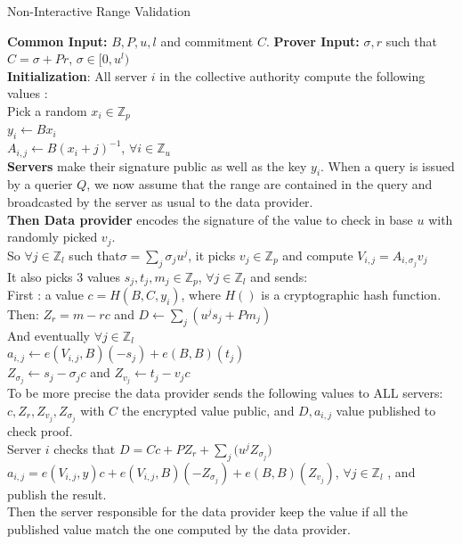 \documentclass{article}
\begin{document}
\begin{algorithm}
\caption{Non-Interactive Range Validation}\label{euclid}
\begin{algorithmic}[1]
\State \textbf{Common Input:} $B, P, u, l$ and commitment $C$.
\State \textbf{Prover Input:} $\sigma, r$ such that $C = \sigma + Pr$, $\sigma \in [0,u^l)$\\

\State \textbf{Initialization}: All server $i$ in the collective authority compute the following values :\\
Pick a random $x_i \in \mathbb{Z}_p$\\
$y_i \gets Bx_i$\\
$A_{i,j} \gets B(x_i + j)^{-1} $, $\forall i \in \mathbb{Z}_u$\\
\State  \textbf{Servers} make their signature public as well as the key $y_i$. When a query is issued by a querier $Q$, we now assume that the range are contained in the query and broadcasted by the server as usual to the data provider.\\

\State \textbf{Then Data provider} encodes the signature of the value to check in base $u$ with randomly picked $v_j$.\\
So $\forall j \in \mathbb{Z}_l $ such that$ \sigma = \sum_{j}{\sigma_j u^j}$, it picks $v_j \in \mathbb{Z}_p$ and compute $V_{i,j} = A_{i,\sigma_j}v_j$\\
It also picks 3 values $s_j,t_j,m_j \in \mathbb{Z}_p $, $\forall j \in \mathbb{Z}_l$ and sends:\\
First : a value $c = H(B,C,y_i)$, where $H()$ is a cryptographic hash function.\\  Then: $Z_r = m-rc$ and $D \gets \sum_{j}{(u^j s_j + Pm_j)}$\\
And eventually $ \forall j \in \mathbb{Z}_l$\\
$a_{i,j} \gets e(V_{i,j},B)(-s_j)+e(B,B)(t_j)$\\ $Z_{\sigma_j} \gets s_j-\sigma_j c$ and $Z_{v_j} \gets t_j-v_j c$\\
To be more precise the data provider sends the following values to ALL servers: $ c, Z_r, Z_{v_j}, Z_{\sigma_j}$ with $C$ the encrypted value public, and $D, a_{i,j}$ value published to check proof.\\

\State Server $i$ checks that $D = Cc + PZ_r + \sum_{j}{(u^j Z_{\sigma_j}}) $\\
$a_{i,j} = e(V_{i,j},y)c + e(V_{i,j},B)(-Z_{\sigma_j}) + e(B,B)(Z_{v_j})$, $\forall j \in \mathbb{Z}_l$ , and publish the result.\\

Then the server responsible for the data provider keep the value if all the published value match the one computed by the data provider.
\end{algorithmic}
\end{algorithm}
\end{document}
